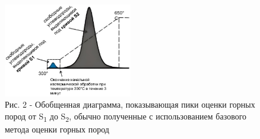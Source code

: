 \begin{figure}[H]
	\centering
	\includegraphics[width=0.5\textwidth]{assets/1259}
	\caption*{Рис. 2 - Обобщенная диаграмма, показывающая пики оценки горных пород от S\textsubscript{1} до S\textsubscript{2}, обычно полученные с использованием базового метода оценки горных пород}
\end{figure}


